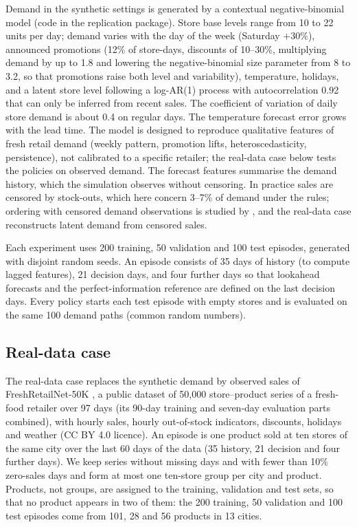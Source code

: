 Demand in the synthetic settings is generated by a contextual negative-binomial model (code in the replication package). Store base levels range from 10 to 22 units per day; demand varies with the day of the week (Saturday $+30\%$), announced promotions (12\% of store-days, discounts of 10--30\%, multiplying demand by up to 1.8 and lowering the negative-binomial size parameter from 8 to 3.2, so that promotions raise both level and variability), temperature, holidays, and a latent store level following a log-AR(1) process with autocorrelation 0.92 that can only be inferred from recent sales. The coefficient of variation of daily store demand is about 0.4 on regular days. The temperature forecast error grows with the lead time. The model is designed to reproduce qualitative features of fresh retail demand (weekly pattern, promotion lifts, heteroscedasticity, persistence), not calibrated to a specific retailer; the real-data case below tests the policies on observed demand. The forecast features summarise the demand history, which the simulation observes without censoring. In practice sales are censored by stock-outs, which here concern 3--7\% of demand under the rules; ordering with censored demand observations is studied by \citet{sachs2014data}, and the real-data case reconstructs latent demand from censored sales.

Each experiment uses 200 training, 50 validation and 100 test episodes, generated with disjoint random seeds. An episode consists of 35 days of history (to compute lagged features), 21 decision days, and four further days so that lookahead forecasts and the perfect-information reference are defined on the last decision days. Every policy starts each test episode with empty stores and is evaluated on the same 100 demand paths (common random numbers).

\subsection{Real-data case}\label{sec:realdata}

The real-data case replaces the synthetic demand by observed sales of FreshRetailNet-50K \citep{wang2025freshretailnet}, a public dataset of 50,000 store--product series of a fresh-food retailer over 97 days (its 90-day training and seven-day evaluation parts combined), with hourly sales, hourly out-of-stock indicators, discounts, holidays and weather (CC BY 4.0 licence). An episode is one product sold at ten stores of the same city over the last 60 days of the data (35 history, 21 decision and four further days). We keep series without missing days and with fewer than 10\% zero-sales days and form at most one ten-store group per city and product. Products, not groups, are assigned to the training, validation and test sets, so that no product appears in two of them: the 200 training, 50 validation and 100 test episodes come from 101, 28 and 56 products in 13 cities.

